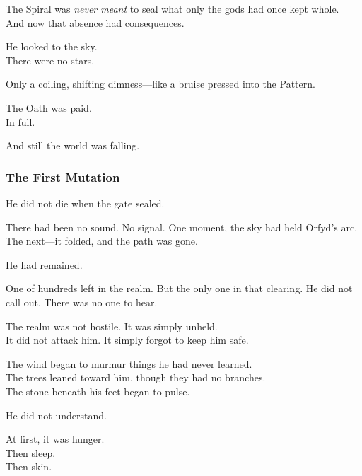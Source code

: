 \documentclass[12pt]{article}
\begin{document}
\vspace{0.5em}
The Spiral was \textit{never meant} to seal what only the gods had once kept whole.\\
And now that absence had consequences.

\vspace{0.5em}
He looked to the sky.\\
There were no stars.

\vspace{0.5em}
Only a coiling, shifting dimness---like a bruise pressed into the Pattern.

\vspace{0.5em}
The Oath was paid.\\
In full.

\vspace{0.5em}
And still the world was falling.

\dotfill

\subsubsection*{The First Mutation}

He did not die when the gate sealed.

\vspace{0.5em}
There had been no sound. No signal. One moment, the sky had held Orfyd’s arc. The next---it folded, and the path was gone.

\vspace{0.5em}
He had remained.

\vspace{0.5em}
One of hundreds left in the realm. But the only one in that clearing. He did not call out. There was no one to hear.

\vspace{0.5em}
The realm was not hostile. It was simply unheld.\\
It did not attack him. It simply forgot to keep him safe.

\vspace{0.5em}
The wind began to murmur things he had never learned.\\
The trees leaned toward him, though they had no branches.\\
The stone beneath his feet began to pulse.

\vspace{0.5em}
He did not understand.

\vspace{0.5em}
At first, it was hunger.\\
Then sleep.\\
Then skin.
\end{document}
